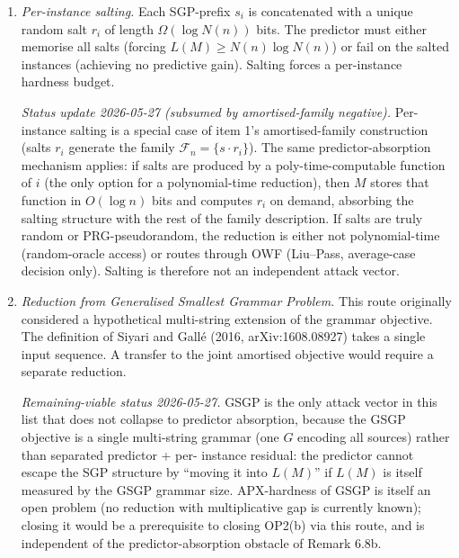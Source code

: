 \documentclass[
]{article}
\begin{document}
\begin{enumerate}
Liu--Pass / OWF route already documented in §13.2, which gives
average-case decision hardness under one-way functions, \emph{not}
worst-case multiplicative APX-hardness. None of (i)--(iii) yields
free-predictor worst-case OP2(b)-APX. \emph{Verdict.} The
amortised-family reformulation, taken in isolation, does not close
OP2(b)-APX. The single-source predictor-absorption obstacle of
Remark 6.8b transfers verbatim to the family-description scale;
the amortisation is symmetric across YES/NO branches and dilutes
the gap to $1+o(1)$ under any poly-time-samplable family.
\item \emph{Per-instance salting.} Each SGP-prefix $s_i$ is concatenated
with a unique random salt $r_i$ of length $\Omega(\log N(n))$ bits.
The predictor must either memorise all salts (forcing $L(M) \geq
N(n) \log N(n)$) or fail on the salted instances (achieving no
predictive gain). Salting forces a per-instance hardness budget.

\emph{Status update 2026-05-27 (subsumed by amortised-family
negative).} Per-instance salting is a special case of item 1's
amortised-family construction (salts $r_i$ generate the family
$\mathcal{F}_n = \{s \cdot r_i\}$). The same predictor-absorption
mechanism applies: if salts are produced by a poly-time-computable
function of $i$ (the only option for a polynomial-time reduction),
then $M$ stores that function in $O(\log n)$ bits and computes
$r_i$ on demand, absorbing the salting structure with the rest of
the family description. If salts are truly random or PRG-pseudo\-random,
the reduction is either not polynomial-time (random-oracle access)
or routes through OWF (Liu--Pass, average-case decision only).
Salting is therefore not an independent attack vector.
\item \emph{Reduction from Generalised Smallest Grammar Problem.}
This route originally considered a hypothetical multi-string extension
of the grammar objective. The definition of Siyari and Gall\'e
(2016, arXiv:1608.08927) takes a single input sequence. A transfer
to the joint amortised objective would require a separate reduction.

\emph{Remaining-viable status 2026-05-27.} GSGP is the only attack
vector in this list that does not collapse to predictor absorption,
because the GSGP objective is a single multi-string grammar (one
$G$ encoding all sources) rather than separated predictor + per-
instance residual: the predictor cannot escape the SGP structure
by ``moving it into $L(M)$'' if $L(M)$ is itself measured by the
GSGP grammar size. APX-hardness of GSGP is itself an open problem
(no reduction with multiplicative gap is currently known); closing
it would be a prerequisite to closing OP2(b) via this route, and
is independent of the predictor-absorption obstacle of Remark 6.8b.


\end{enumerate}
\end{document}
